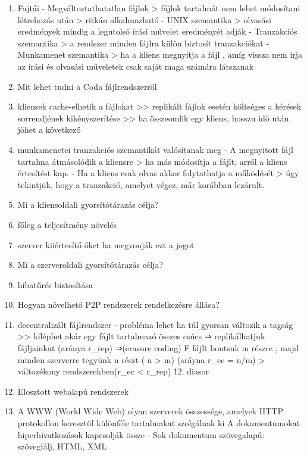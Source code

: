 \documentclass[twoside, a4paper, 12pt]{article}
\begin{document}
\begin{enumerate}
    \item Fajtái
        - Megváltoztathatatlan fájlok
        > fájlok tartalmát nem lehet módosítani létrehozás után
        > ritkán alkalmazható
        - UNIX szemantika
        > olvasási eredmények mindig a legutolsó írási művelet eredményét adják
        - Tranzakciós szemantika
        > a rendszer minden fájlra külön biztosít tranzakciókat
        - Munkamenet szemantika
        > ha a kliens megnyitja a fájl , amíg vissza nem írja az írási és olvasási műveletek csak saját maga számára látszanak
    \item  Mit lehet tudni a Coda fájlrendszerről 
    \item kliensek cache-elhetik a fájlokat
        >> replikált fájlok esetén költséges a kérések sorrendjének kikényszerítése
        >> ha összeomlik egy kliens, hosszu idő után jöhet a következő
    \item munkamenetei tranzakciós szemantikát valósítanak meg
        - A megnyitott fájl tartalma átmásolódik a kliensre
        > ha más módosítja a fájlt, arról a kliens értesítést kap.
        - Ha a kliens csak olvas akkor folytathatja a működését 
        > úgy tekintjük, hogy a tranzakció, amelyet végez, már korábban lezárult.	
    \item  Mi a kliensoldali gyorsítótárazás célja?
    \item főleg a teljesítmény növelés
    \item szerver kiiértesítő őket ha megvonják ezt a jogot
    \item  Mi a szerveroldali gyorsítótárazás célja?
    \item hibatűrés biztosítása
    \item  Hogyan növelhető P2P rendszerek rendelkezésre állása?
    \item decentralizált fájlrendszer
        - probléma lehet ha túl gyorsan változik a tagság >> kiléphet akár egy fájlt tartalmazó összes csúcs
        ⇒ replikálhatjuk fájljainkat (aránya r\_rep)
        ⇒(erasure coding) F fájlt bontsuk m részre , majd minden szerverre
        tegyünk n részt ( n > m) (aráyna r\_ec = n/m) 
        > változékony rendszerekben(r\_ec < r\_rep)
        12. diasor
    \item  Elosztott webalapú rendszerek
    \item A WWW (World Wide Web) olyan szerverek összessége, amelyek HTTP protokollon keresztül különféle tartalmakat szolgálnak ki
        A dokumentumokat hiperhivatkozások kapcsolják össze
        - Sok dokumentum szövegalapú: szövegfálj, HTML, XML

\end{enumerate}
\end{document}

